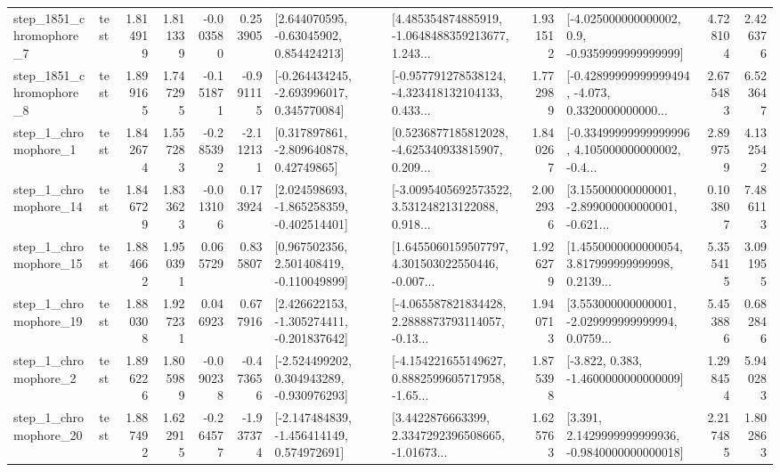 \begin{tabular}{llrrrrllrlrr}
  step\_1851\_chromophore\_7 &      test &      1.814919 &    1.811339 &     -0.003580 &  0.253905 &     [2.644070595, -0.63045902, 0.854424213] &  [4.485354874885919, -1.0648488359213677, 1.243... &       1.931512 &     [-4.025000000000002, 0.9, -0.9359999999999999] &            4.728104 &          2.426376 \\
  step\_1851\_chromophore\_8 &      test &      1.899165 &    1.747295 &     -0.151871 & -0.991115 &   [-0.264434245, -2.693996017, 0.345770084] &  [-0.957791278538124, -4.323418132104133, 0.433... &       1.772989 &  [-0.42899999999999494, -4.073, 0.3320000000000... &            2.675483 &          6.523647 \\
     step\_1\_chromophore\_1 &      test &      1.842674 &    1.557283 &     -0.285392 & -2.112131 &     [0.317897861, -2.809640878, 0.42749865] &  [0.5236877185812028, -4.625340933815907, 0.209... &       1.840267 &  [-0.33499999999999996, 4.105000000000002, -0.4... &            2.899759 &          4.132542 \\
    step\_1\_chromophore\_14 &      test &      1.846729 &    1.833623 &     -0.013106 &  0.173924 &   [2.024598693, -1.865258359, -0.402514401] &  [-3.0095405692573522, 3.531248213122088, 0.918... &       2.002936 &  [3.155000000000001, -2.899000000000001, -0.621... &            0.103807 &          7.486113 \\
    step\_1\_chromophore\_15 &      test &      1.884662 &    1.950391 &      0.065729 &  0.835807 &    [0.967502356, 2.501408419, -0.110049899] &  [1.6455060159507797, 4.301503022550446, -0.007... &       1.926279 &  [1.4550000000000054, 3.817999999999998, 0.2139... &            5.355415 &          3.091955 \\
    step\_1\_chromophore\_19 &      test &      1.880308 &    1.927231 &      0.046923 &  0.677916 &   [2.426622153, -1.305274411, -0.201837642] &  [-4.065587821834428, 2.2888873793114057, -0.13... &       1.940713 &  [3.553000000000001, -2.029999999999994, 0.0759... &            5.453886 &          0.682846 \\
     step\_1\_chromophore\_2 &      test &      1.896226 &    1.805989 &     -0.090238 & -0.473656 &   [-2.524499202, 0.304943289, -0.930976293] &  [-4.154221655149627, 0.8882599605717958, -1.65... &       1.875398 &               [-3.822, 0.383, -1.4600000000000009] &            1.298454 &          5.940283 \\
    step\_1\_chromophore\_20 &      test &      1.887492 &    1.622915 &     -0.264577 & -1.937374 &   [-2.147484839, -1.456414149, 0.574972691] &  [3.4422876663399, 2.3347292396508665, -1.01673... &       1.625763 &   [3.391, 2.1429999999999936, -0.9840000000000018] &            2.217485 &          1.802863 \\

\end{tabular}
